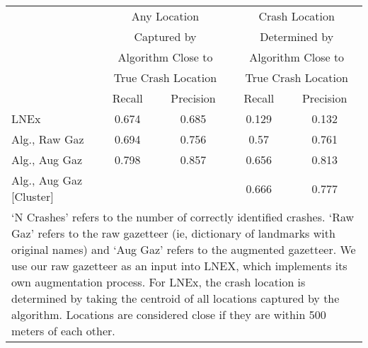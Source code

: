 \begin{tabular}{l cc | cc} \hline  & \multicolumn{2}{c|}{Any Location} & \multicolumn{2}{c}{Crash Location } \\  & \multicolumn{2}{c|}{Captured by} & \multicolumn{2}{c}{Determined by} \\  & \multicolumn{2}{c|}{Algorithm Close to} & \multicolumn{2}{c}{Algorithm Close to} \\  & \multicolumn{2}{c|}{True Crash Location} & \multicolumn{2}{c}{True Crash Location} \\  \hline  & Recall & Precision & Recall & Precision \\ \hline LNEx & 0.674  & 0.685  & 0.129  & 0.132  \\ Alg., Raw Gaz & 0.694  & 0.756  & 0.57  & 0.761  \\ Alg., Aug Gaz & 0.798  & 0.857  & 0.656  & 0.813  \\ Alg., Aug Gaz [Cluster] &  & & 0.666  & 0.777  \\ \hline \multicolumn{5}{p{11cm}}{`N Crashes' refers to the number of correctly 
    identified crashes. `Raw Gaz' refers to the raw gazetteer (ie, dictionary of 
    landmarks with original names) and `Aug Gaz' refers to the augmented gazetteer. 
    We use our raw gazetteer as an input into LNEX, which implements its own augmentation
    process. For LNEx, the crash location is determined by taking the centroid of all 
    locations captured by the algorithm. Locations are considered close if they are 
    within 500 meters of each other.} \end{tabular} 